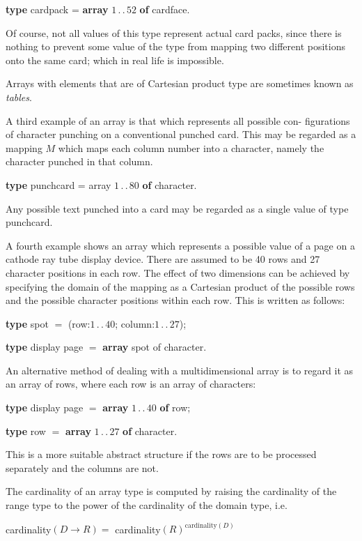 \quad \textbf{type} cardpack = \textbf{array} $1\,.\,.\,52$ \textbf{of} cardface.

\noindent
Of course, not all values of this type represent actual card packs, since there is nothing to prevent some value of the type from mapping two different positions onto the same card; which in real life is impossible.

Arrays with elements that are of Cartesian product type are sometimes known as \textit{tables}.

A third example of an array is that which represents all possible con- figurations of character punching on a conventional punched card. This may be regarded as a mapping $M$ which maps each column number into a character, namely the character punched in that column.

\quad \textbf{type} punchcard = array $1\,.\,.\,80$ \textbf{of} character.

\noindent
Any possible text punched into a card may be regarded as a single value of type punchcard.

A fourth example shows an array which represents a possible value of a page on a cathode ray tube display device. There are assumed to be 40 rows and 27 character positions in each row. The effect of two dimensions can be achieved by specifying the domain of the mapping as a Cartesian product of the possible rows and the possible character positions within each row. This is written as follows:

\quad \textbf{type} spot $=$ (row:$1\,.\,.\,40$; column:$1\,.\,.\,27$);

\quad \textbf{type} display page $=$ \textbf{array} spot of character.

An alternative method of dealing with a multidimensional array is to regard it as an array of rows, where each row is an array of characters:

\quad \textbf{type} display page $=$ \textbf{array} $1\,.\,.\,40$ \textbf{of} row;

\quad \textbf{type} row $=$ \textbf{array} $1\,.\,.\,27$ \textbf{of} character.

\noindent
This is a more suitable abstract structure if the rows are to be processed separately and the columns are not.

The cardinality of an array type is computed by raising the cardinality of the range type to the power of the cardinality of the domain type, i.e.

\quad cardinality$(D \rightarrow R) =$ cardinality$(R)^{\text{cardinality}(D)}$

